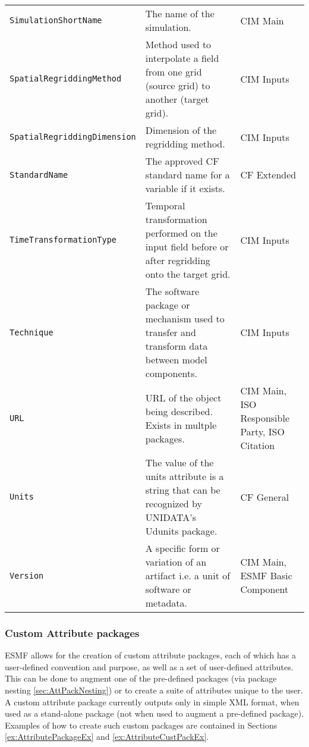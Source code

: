 \begin{longtable}{|p{7cm}|p{5cm}|p{15mm}|}
     {\tt SimulationShortName} & The name of the simulation. & CIM Main\\
     {\tt SpatialRegriddingMethod} & Method used to interpolate a field from one grid (source grid) to another (target grid). & CIM Inputs\\
     {\tt SpatialRegriddingDimension} & Dimension of the regridding method. & CIM Inputs\\
     {\tt StandardName} & The approved CF standard name for a variable if it exists. &  CF Extended\\
     {\tt TimeTransformationType} & Temporal transformation performed on the input field before or after regridding onto the target grid.& CIM Inputs\\
     {\tt Technique} & The software package or mechanism used to transfer and transform data between model components. & CIM Inputs\\
     {\tt URL} & URL of the object being described. Exists in multple packages. & CIM Main, ISO Responsible Party, ISO Citation\\
     {\tt Units}  & The value of the units attribute is a string that can be recognized by UNIDATA's Udunits package. & CF General\\
     {\tt Version} & A specific form or variation of an artifact i.e. a unit of software or metadata. & CIM Main, ESMF Basic Component\\
\hline\hline
\end{longtable}

\vspace{.20in}

\subsubsection{Custom Attribute packages}
\label{sec:CustomAttPacks}

ESMF allows for the creation of custom attribute packages, each of which has a user-defined convention and purpose, as well as a set of user-defined attributes. This can be done to augment one of the pre-defined packages (via package nesting \ref{sec:AttPackNesting}) or to create a suite of attributes unique to the user. A custom attribute package currently outputs only in simple XML format, when used as a stand-alone package (not when used to augment a pre-defined package).  Examples of how to create such custom packages are contained in Sections \ref{ex:AttributePackageEx} and \ref{ex:AttributeCustPackEx}.
